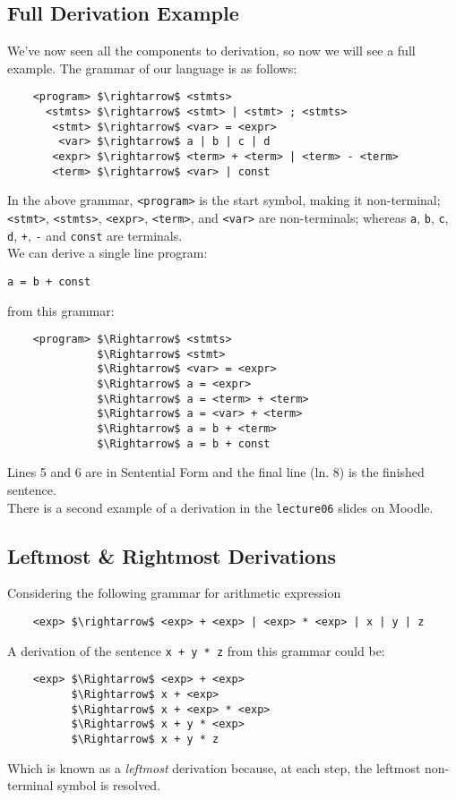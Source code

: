 \subsection{Full Derivation Example}
We've now seen all the components to derivation, so now we will see a full example. The grammar of our language is as follows:
\begin{lstlisting}
    <program> $\rightarrow$ <stmts>
      <stmts> $\rightarrow$ <stmt> | <stmt> ; <stmts>
       <stmt> $\rightarrow$ <var> = <expr>
        <var> $\rightarrow$ a | b | c | d
       <expr> $\rightarrow$ <term> + <term> | <term> - <term>
       <term> $\rightarrow$ <var> | const
\end{lstlisting}
In the above grammar, \verb|<program>| is the start symbol, making it non-terminal; \verb|<stmt>|, \verb|<stmts>|, \verb|<expr>|, \verb|<term>|, and \verb|<var>| are non-terminals; whereas \verb|a|, \verb|b|, \verb|c|, \verb|d|, \verb|+|, \verb|-| and \verb|const| are terminals. \\

We can derive a single line program:
\begin{center}
    \verb|a = b + const|
\end{center}
from this grammar:
\begin{lstlisting}
    <program> $\Rightarrow$ <stmts>
              $\Rightarrow$ <stmt>
              $\Rightarrow$ <var> = <expr>
              $\Rightarrow$ a = <expr>
              $\Rightarrow$ a = <term> + <term>
              $\Rightarrow$ a = <var> + <term>
              $\Rightarrow$ a = b + <term>
              $\Rightarrow$ a = b + const
\end{lstlisting}
Lines 5 and 6 are in Sentential Form and the final line (ln. 8) is the finished sentence.\\

There is a second example of a derivation in the \verb|lecture06| slides on Moodle.

\subsection{Leftmost \& Rightmost Derivations}
Considering the following grammar for arithmetic expression
\begin{lstlisting}
    <exp> $\rightarrow$ <exp> + <exp> | <exp> * <exp> | x | y | z
\end{lstlisting}
A derivation of the sentence \verb|x + y * z| from this grammar could be:
\begin{lstlisting}
    <exp> $\Rightarrow$ <exp> + <exp>
          $\Rightarrow$ x + <exp>
          $\Rightarrow$ x + <exp> * <exp>
          $\Rightarrow$ x + y * <exp>
          $\Rightarrow$ x + y * z
\end{lstlisting}
Which is known as a \textit{leftmost} derivation because, at each step, the leftmost non-terminal symbol is resolved.\\

